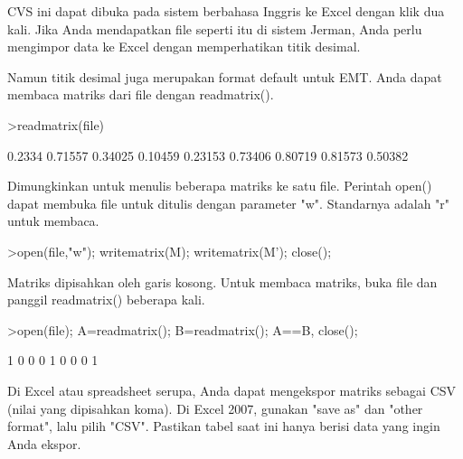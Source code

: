 \documentclass{article}
\begin{document}
\begin{eulernotebook}
\begin{eulercomment}
\begin{eulercomment}
\begin{eulercomment}
\begin{eulercomment}
\begin{eulercomment}
\begin{eulercomment}
\begin{eulercomment}
\begin{eulercomment}
\begin{eulercomment}
\begin{eulercomment}
\begin{eulercomment}
\begin{eulercomment}
\begin{eulercomment}
\begin{eulercomment}
\begin{euleroutput}
\end{euleroutput}
\begin{eulercomment}
CVS ini dapat dibuka pada sistem berbahasa Inggris ke Excel dengan
klik dua kali. Jika Anda mendapatkan file seperti itu di sistem
Jerman, Anda perlu mengimpor data ke Excel dengan memperhatikan titik
desimal.

Namun titik desimal juga merupakan format default untuk EMT. Anda
dapat membaca matriks dari file dengan readmatrix().
\end{eulercomment}
\begin{eulerprompt}
>readmatrix(file)
\end{eulerprompt}
\begin{euleroutput}
     0.2334   0.71557   0.34025 
    0.10459   0.23153   0.73406 
    0.80719   0.81573   0.50382 
\end{euleroutput}
\begin{eulercomment}
Dimungkinkan untuk menulis beberapa matriks ke satu file. Perintah
open() dapat membuka file untuk ditulis dengan parameter "w".
Standarnya adalah "r" untuk membaca.
\end{eulercomment}
\begin{eulerprompt}
>open(file,"w"); writematrix(M); writematrix(M'); close();
\end{eulerprompt}
\begin{eulercomment}
Matriks dipisahkan oleh garis kosong. Untuk membaca matriks, buka file
dan panggil readmatrix() beberapa kali.
\end{eulercomment}
\begin{eulerprompt}
>open(file); A=readmatrix(); B=readmatrix(); A==B, close();
\end{eulerprompt}
\begin{euleroutput}
          1         0         0 
          0         1         0 
          0         0         1 
\end{euleroutput}
\begin{eulercomment}
Di Excel atau spreadsheet serupa, Anda dapat mengekspor matriks
sebagai CSV (nilai yang dipisahkan koma). Di Excel 2007, gunakan "save
as" dan "other format", lalu pilih "CSV". Pastikan tabel saat ini
hanya berisi data yang ingin Anda ekspor.


\end{eulercomment}
\end{eulercomment}
\end{eulercomment}
\end{eulercomment}
\end{eulercomment}
\end{eulercomment}
\end{eulercomment}
\end{eulercomment}
\end{eulercomment}
\end{eulercomment}
\end{eulercomment}
\end{eulercomment}
\end{eulercomment}
\end{eulercomment}
\end{eulercomment}
\end{eulernotebook}
\end{document}
